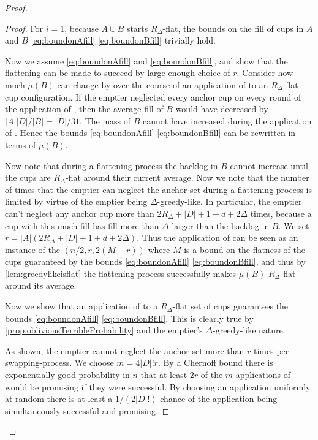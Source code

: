 \begin{proof}
\begin{proof}
  For $i=1$, because $A\cup B$ starts $R_\Delta$-flat, the bounds
  on the fill of cups in $A$ and $B$ \eqref{eq:boundonAfill}
  \eqref{eq:boundonBfill} trivially hold.

  Now we assume \eqref{eq:boundonAfill} and
  \eqref{eq:boundonBfill}, and show that the flattening can be
  made to succeed by large enough choice of $r$. 
  Consider how much $\mu(B)$ can change by over the course of an
  application of \randalg to an $R_\Delta$-flat cup configuration.
  If the emptier neglected every anchor cup on every round of the
  application of \randalg, then the average fill of $B$ would have
  decreased by $|A||D|/|B| = |D|/31$. The mass of $B$ cannot have
  increased during the application of \randalg.
  Hence the bounds \eqref{eq:boundonAfill}
  \eqref{eq:boundonBfill} can be rewritten in terms of $\mu(B)$.

  Now note that during a flattening process the backlog in $B$
  cannot increase until the cups are $R_\Delta$-flat around their
  current average. Now we note that the number of times that the
  emptier can neglect the anchor set during a flattening process
  is limited by virtue of the emptier being $\Delta$-greedy-like.
  In particular, the emptier can't neglect any anchor cup more
  than $2R_\Delta + |D| + 1 + d + 2\Delta$ times, because a cup
  with this much fill has fill more than $\Delta$ larger than the
  backlog in $B$. We set $r = |A|(2R_\Delta + |D| + 1 +
  d + 2\Delta)$. Thus the application of \flatalg can be seen as an instance of the
  $(n/2, r, 2(M + r))$ where $M$ is a bound on the flatness of
  the cups guaranteed by the bounds \eqref{eq:boundonAfill}
  \eqref{eq:boundonBfill}, and thus by
  \cref{lem:greedylikeisflat} the flattening process
  successfully makes $\mu(B)$ $R_\Delta$-flat around its average.

  Now we show that an application of \randalg to a
  $R_\Delta$-flat set of cups guarantees the bounds
  \eqref{eq:boundonAfill} \eqref{eq:boundonBfill}.
  This is clearly true by
  \cref{prop:obliviousTerribleProbability} and
  the emptier's $\Delta$-greedy-like nature.

  As shown, the emptier cannot neglect the anchor set more than
  $r$ times per swapping-process. We choose $m = 4|D|! r$. By a
  Chernoff bound there is exponentially good probability in $n$
  that at least $2r$ of the $m$ applications of \randalg would be
  promising if they were successful. By choosing an application
  uniformly at random there is at least a $1/(2|D|!)$ chance of
  the application being simultaneously successful and promising. 


\end{proof}
\end{proof}
